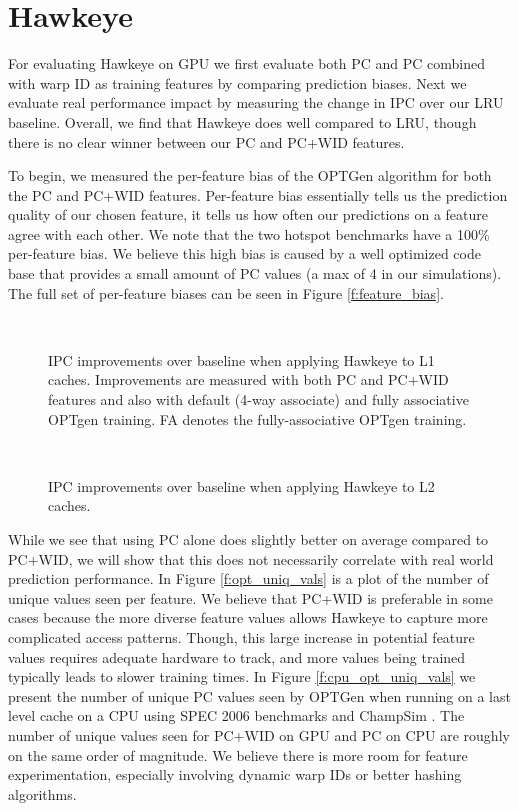 \section{Hawkeye}
For evaluating Hawkeye on GPU we first evaluate both PC and PC combined with warp ID as training features by comparing prediction biases. Next we evaluate real performance impact by measuring the change in IPC over our LRU baseline. Overall, we find that Hawkeye does well compared to LRU, though there is no clear winner between our PC and PC+WID features.

To begin, we measured the per-feature bias of the OPTGen algorithm for both the PC and PC+WID features. Per-feature bias essentially tells us the prediction quality of our chosen feature, it tells us how often our predictions on a feature agree with each other. We note that the two hotspot benchmarks have a 100\% per-feature bias. We believe this high bias is caused by a well optimized code base that provides a small amount of PC values (a max of 4 in our simulations). The full set of per-feature biases can be seen in Figure \ref{f:feature_bias}.

\begin{figure}[htb]
\begin{center}
\ 
\caption{IPC improvements over baseline when applying Hawkeye to L1 caches. Improvements are measured with both PC and PC+WID features and also with default (4-way associate) and fully associative OPTgen training. FA denotes the fully-associative OPTgen training.}
\label{f:l1_ipc}
\end{center}
\end{figure}

\begin{figure}[htb]
\begin{center}
\ 
\caption{IPC improvements over baseline when applying Hawkeye to L2 caches.}
\label{f:l2_ipc}
\end{center}
\end{figure}

While we see that using PC alone does slightly better on average compared to PC+WID, we will show that this does not necessarily correlate with real world prediction performance. In Figure \ref{f:opt_uniq_vals} is a plot of the number of unique values seen per feature. We believe that PC+WID is preferable in some cases because the more diverse feature values allows Hawkeye to capture more complicated access patterns. Though, this large increase in potential feature values requires adequate hardware to track, and more values being trained typically leads to slower training times. In Figure \ref{f:cpu_opt_uniq_vals} we present the number of unique PC values seen by OPTGen when running on a last level cache on a CPU using SPEC 2006 \cite{spec} benchmarks and ChampSim \cite{champsim}. The number of unique values seen for PC+WID on GPU and PC on CPU are roughly on the same order of magnitude. We believe there is more room for feature experimentation, especially involving dynamic warp IDs or better hashing algorithms.

